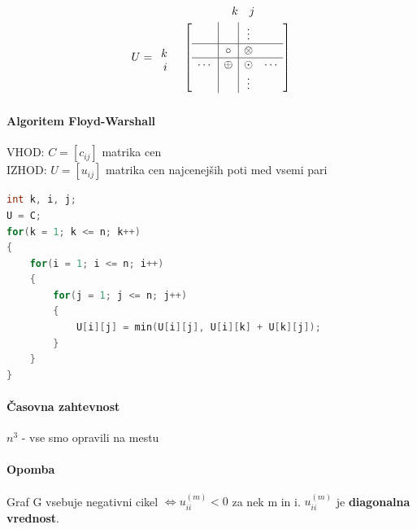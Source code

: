 \documentclass[a4paper,10pt]{article}
\begin{document}
$$
\begin{array}{rc}
&
	\begin{array}{cccc}
	\hspace{15pt}	& k	& j	& \hspace{5pt}	\\
	\end{array}
\\%
	U =
	\begin{array}{r}
	\vspace{13pt}	\\
	k		\\
	i		\\
	\vspace{7pt}	\\
	\end{array}
&
	\left[
	\begin{array}{c|c|cc}
		&		& \vdots 	&		\\\hline
		& \circ 	& \otimes	&		\\\hline
	\cdots	& \oplus	& \odot		& \cdots	\\
		&		& \vdots	&
	\end{array}
	\right]
\end{array}
$$

\paragraph{Algoritem Floyd-Warshall}
\begin{flushleft}
VHOD: $C = \left[ c_{ij} \right]$ matrika cen\\
IZHOD: $U= \left[ u_{ij} \right]$ matrika cen najcenej\v sih poti med vsemi pari
\begin{lstlisting}[language=C,caption={Algoritem Floyd-Warshall}]
int k, i, j;
U = C;
for(k = 1; k <= n; k++)
{
    for(i = 1; i <= n; i++)
    {
        for(j = 1; j <= n; j++)
        {
            U[i][j] = min(U[i][j], U[i][k] + U[k][j]);
        }
    }
}
\end{lstlisting}
\end{flushleft}

\paragraph{\v Casovna zahtevnost}
$n^3$ - vse smo opravili na mestu

\paragraph{Opomba}
Graf G vsebuje negativni cikel $\Longleftrightarrow u_{ii}^{(m)} < 0$ za nek m in i. $u_{ii}^{(m)}$ je \textbf{diagonalna vrednost}.
\end{document}
